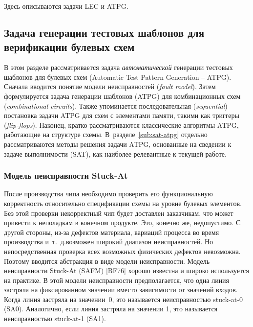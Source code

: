Здесь описываются задачи LEC и ATPG.



\subsection{Задача генерации тестовых шаблонов для верификации булевых схем}
\label{sub:atpg}

В этом разделе рассматривается задача \textit{автоматической} генерации тестовых шаблонов для булевых схем (Automatic Test Pattern Generation \--- ATPG).
Сначала вводится понятие модели неисправностей (\textit{fault model}).
Затем формулируется задача генерации шаблонов (ATPG) для комбинационных схем (\textit{combinational circuits}).
Также упоминается последовательная (\textit{sequential}) постановка задачи ATPG для схем с элементами памяти, такими как триггеры (\textit{flip-flops}).
Наконец, кратко рассматриваются классические алгоритмы ATPG, работающие на структуре схемы.
В~разделе~\ref{sub:sat-atpg} отдельно рассматриваются методы решения задачи ATPG, основанные на сведении к задаче выполнимости (SAT), как наиболее релевантные к текущей работе.

\subsubsection{Модель неисправности Stuck-At}

После производства чипа необходимо проверить его функциональную корректность относительно спецификации схемы на уровне булевых элементов.
Без этой проверки некорректный чип будет доставлен заказчикам, что может привести к неполадкам в конечном продукте. Это, конечно же, недопустимо.
С другой стороны, из-за дефектов материала, вариаций процесса во время производства и~т.\@~д.\@ возможен широкий диапазон неисправностей.
Но непосредственная проверка всех возможных физических дефектов невозможна.
Поэтому вводится абстракция в виде модели неисправности.
Модель неисправности Stuck-At (SAFM) [BF76] хорошо известна и широко используется на практике.
В этой модели неисправности предполагается, что одна линия застряла на фиксированном значении вместо зависимости от значений входов.
Когда линия застряла на значении~0, это называется неисправностью stuck-at-0 (SA0).
Аналогично, если линия застряла на значении 1, это называется неисправностью stuck-at-1 (SA1).

